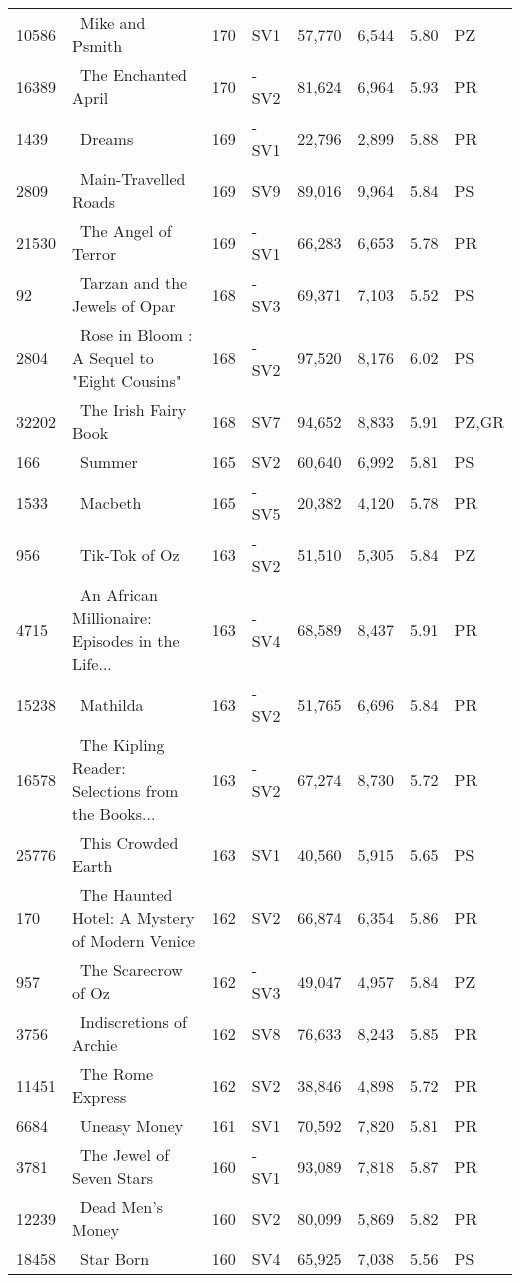 \begin{longtable}{l | l | l | l | l | l | l | l}
10586 & ~Mike and Psmith & 170 & SV1 & 57,770 & 6,544 & 5.80 & PZ\\
16389 & ~The Enchanted April & 170 & -SV2 & 81,624 & 6,964 & 5.93 & PR\\
1439 & ~Dreams & 169 & -SV1 & 22,796 & 2,899 & 5.88 & PR\\
2809 & ~Main-Travelled Roads & 169 & SV9 & 89,016 & 9,964 & 5.84 & PS\\
21530 & ~The Angel of Terror & 169 & -SV1 & 66,283 & 6,653 & 5.78 & PR\\
92 & ~Tarzan and the Jewels of Opar & 168 & -SV3 & 69,371 & 7,103 & 5.52 & PS\\
2804 & ~Rose in Bloom
: A Sequel to "Eight Cousins" & 168 & -SV2 & 97,520 & 8,176 & 6.02 & PS\\
32202 & ~The Irish Fairy Book & 168 & SV7 & 94,652 & 8,833 & 5.91 & PZ,GR\\
166 & ~Summer & 165 & SV2 & 60,640 & 6,992 & 5.81 & PS\\
1533 & ~Macbeth & 165 & -SV5 & 20,382 & 4,120 & 5.78 & PR\\
956 & ~Tik-Tok of Oz & 163 & -SV2 & 51,510 & 5,305 & 5.84 & PZ\\
4715 & ~An African Millionaire: Episodes in the Life... & 163 & -SV4 & 68,589 & 8,437 & 5.91 & PR\\
15238 & ~Mathilda & 163 & -SV2 & 51,765 & 6,696 & 5.84 & PR\\
16578 & ~The Kipling Reader: Selections from the Books... & 163 & -SV2 & 67,274 & 8,730 & 5.72 & PR\\
25776 & ~This Crowded Earth & 163 & SV1 & 40,560 & 5,915 & 5.65 & PS\\
170 & ~The Haunted Hotel: A Mystery of Modern Venice & 162 & SV2 & 66,874 & 6,354 & 5.86 & PR\\
957 & ~The Scarecrow of Oz & 162 & -SV3 & 49,047 & 4,957 & 5.84 & PZ\\
3756 & ~Indiscretions of Archie & 162 & SV8 & 76,633 & 8,243 & 5.85 & PR\\
11451 & ~The Rome Express & 162 & SV2 & 38,846 & 4,898 & 5.72 & PR\\
6684 & ~Uneasy Money & 161 & SV1 & 70,592 & 7,820 & 5.81 & PR\\
3781 & ~The Jewel of Seven Stars & 160 & -SV1 & 93,089 & 7,818 & 5.87 & PR\\
12239 & ~Dead Men's Money & 160 & SV2 & 80,099 & 5,869 & 5.82 & PR\\
18458 & ~Star Born & 160 & SV4 & 65,925 & 7,038 & 5.56 & PS\\

\end{longtable}
